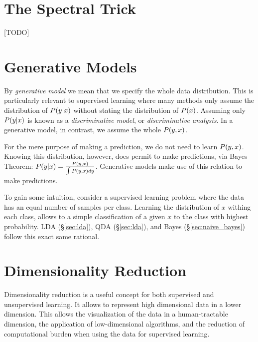 
\chapter{The Spectral Trick}
\label{apx:spectral}
[TODO]



\chapter{Generative Models}
\label{apx:generative_concept}

By \emph{generative model} we mean that we specify the whole data distribution. This is particularly relevant to supervised learning where many methods only assume the distribution of $P(y|x)$ without stating the distribution of $P(x)$.
Assuming only $P(y|x)$ is known as a \emph{discriminative model}, or \emph{discriminative analysis}.
In a generative model, in contrast, we assume the whole $P(y,x)$.

For the mere purpose of making a prediction, we do not need to learn $P(y,x)$. 
Knowing this distribution, however, does permit to make predictions, via Bayes Theorem: 
$P(y|x)=\frac{P(y,x)}{\int P(y,x)dy}$.
Generative models make use of this relation to make predictions. 

To gain some intuition, consider a supervised learning problem where the data has an equal number of samples per class. 
Learning the distribution of $x$ withing each class, allows to a simple classification of a given $x$ to the class with highest probability. LDA (\S\ref{sec:lda}), QDA (\S\ref{sec:lda}), and \Naive Bayes (\S\ref{sec:naive_bayes}) follow this exact same rational.







\chapter{Dimensionality Reduction}
\label{apx:dim_reduce}

Dimensionality reduction is a useful concept for both supervised and unsupervised learning. 
It allows to represent high dimensional data in a lower dimension. 
This allows the visualization of the data in a human-tractable dimension, the application of low-dimensional algorithms, and the reduction of computational burden when using the data for supervised learning. 

